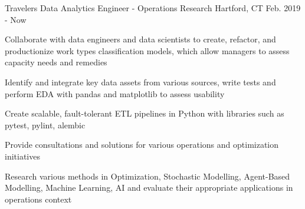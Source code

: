 

\begin{cventries}

  \cventry
    {Travelers} %
    {Data Analytics Engineer - Operations Research} %
    {Hartford, CT} %
    {Feb. 2019 - Now} %
    {
      \begin{cvitems} %
        \item {Collaborate with data engineers and data scientists to create, refactor, and productionize 
        work types classification models, which allow managers to assess capacity needs and remedies}
        \item {Identify and integrate key data assets from various sources, write tests and perform EDA with pandas and matplotlib
        to assess usability}
        \item {Create scalable, fault-tolerant ETL pipelines in Python with libraries such as pytest, pylint, alembic}
        \item {Provide consultations and solutions for various operations and optimization initiatives}
        \item {Research various methods in Optimization, Stochastic Modelling, Agent-Based Modelling, Machine Learning, AI 
        and evaluate their appropriate applications in operations context}
      \end{cvitems}
    }


\end{cventries}

